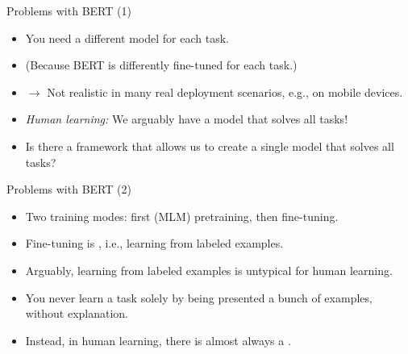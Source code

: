 \begin{frame}{Problems with BERT (1)}

\vfill

  \begin{itemize}
\item You need a different model for each task.
\item[] (Because BERT is differently fine-tuned for each task.)
\item[] $\to$ Not realistic in many real deployment scenarios, e.g., on mobile devices.
\item \textit{Human learning:} We arguably have a  model that solves all tasks!
\item \ques Is there a framework that allows us to create a single model that solves all tasks?
    \end{itemize}

\vfill

\end{frame}


\begin{frame}{Problems with BERT (2)}

\vfill
			
\begin{itemize}
\item Two training modes: first (MLM) pretraining, then fine-tuning.
\item Fine-tuning is , i.e., learning from labeled examples.
\item Arguably, learning from labeled examples is untypical for human learning.
\item You never learn a task solely by being presented a bunch of examples, without explanation.
\item Instead, in human learning, there is almost always a .
    \end{itemize}

\vfill

\end{frame}


